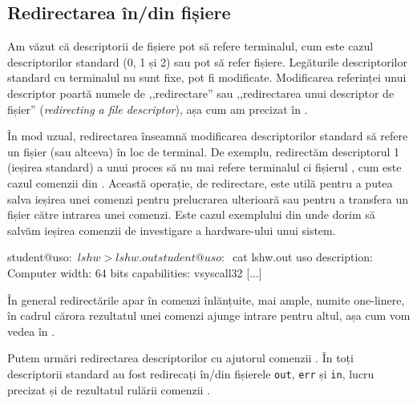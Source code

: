 \subsection{Redirectarea în/din fișiere}
\label{sec:process-fisiere-redirectare}

Am văzut că descriptorii de fișiere pot să refere terminalul, cum este cazul
descriptorilor standard (0, 1 și 2) sau pot să refer fișiere. Legăturile
descriptorilor standard cu terminalul nu sunt fixe, pot fi modificate.
Modificarea referinței unui descriptor poartă numele de ,,redirectare'' sau
,,redirectarea unui descriptor de fișier'' (\textit{redirecting a file
descriptor}), așa cum am precizat în .

În mod uzual, redirectarea înseamnă modificarea descriptorilor standard să
refere un fișier (sau altceva) în loc de terminal. De exemplu, redirectăm
descriptorul 1 (ieșirea standard) a unui proces să nu mai refere terminalul ci
fișierul , cum este cazul comenzii din .
Această operație, de redirectare, este utilă pentru a putea salva ieșirea unei
comenzi pentru prelucrarea ulterioară sau pentru a transfera un fișier către
intrarea unei comenzi. Este cazul exemplului din  unde dorim să
salvăm ieșirea comenzii de investigare a hardware-ului unui sistem.

\begin{screen}[caption={Redirectarea ieșirii standard (stdout)},label={lst:process:redirect-stdout}]
student@uso:~$ lshw > lshw.out
student@uso:~$ cat lshw.out
uso
    description: Computer
    width: 64 bits
    capabilities: vsyscall32
[...]
\end{screen}

În general redirectările apar în comenzi înlănțuite, mai ample, numite
one-linere, în cadrul cărora rezultatul unei comenzi ajunge intrare pentru
altul, așa cum vom vedea în
.

Putem urmări redirectarea descriptorilor cu ajutorul comenzii . În  toți descriptorii standard au fost redirecați în/din fișierele \texttt{out}, \texttt{err} și \texttt{in}, lucru precizat și de rezultatul rulării comenzii .

